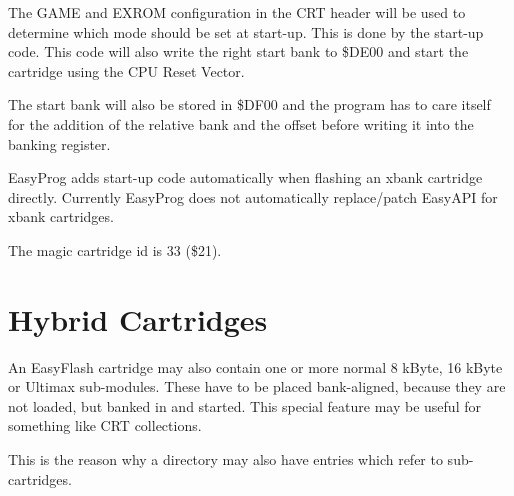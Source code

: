 \documentclass[a4paper,oneside]{memoir}
\begin{document}
The GAME and EXROM configuration in the CRT header will be used to determine
which mode should be set at start-up. This is done by the start-up code. This
code will also write the right start bank to \$DE00 and start the cartridge
using the CPU Reset Vector.

The start bank will also be stored in \$DF00 and the program has to care itself
for the addition of the relative bank and the offset before writing it into the
banking register.

EasyProg adds start-up code automatically when flashing an xbank cartridge
directly. Currently EasyProg does not automatically replace/patch EasyAPI for
xbank cartridges.
 
The magic cartridge id is 33 (\$21).


\chapter{Hybrid Cartridges}
An EasyFlash cartridge may also contain one or more normal 8 kByte, 16 kByte or
Ultimax sub-modules. These have to be placed bank-aligned, because they are not
loaded, but banked in and started. This special feature may be useful for
something like CRT collections.

This is the reason why a directory may also have entries which refer to
sub-cartridges.
\end{document}
